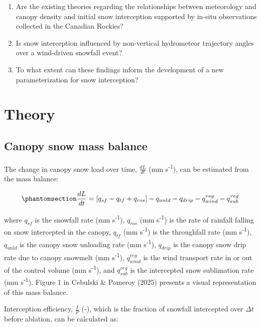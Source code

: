 \documentclass[
  letterpaper,
  DIV=11,
  numbers=noendperiod]{scrartcl}
\begin{document}
\begin{enumerate}
\def\labelenumi{\arabic{enumi}.}
\item
  Are the existing theories regarding the relationships between
  meteorology and canopy density and initial snow interception supported
  by in-situ observations collected in the Canadian Rockies?
\item
  Is snow interception influenced by non-vertical hydrometeor trajectory
  angles over a wind-driven snowfall event?
\item
  To what extent can these findings inform the development of a new
  parameterization for snow interception?
\end{enumerate}

\section{Theory}\label{theory}

\subsection{Canopy snow mass balance}\label{canopy-snow-mass-balance}

The change in canopy snow load over time, \(\frac{dL}{dt}\) (mm
s\textsuperscript{-1}), can be estimated from the mass balance:

\begin{equation}\phantomsection\label{eq-canopy-mass-bal}{
\frac{dL}{dt} = 
[q_{sf} - q_{tf} + q_{ros}] - q_{unld} - q_{drip} - q_{wind}^{veg} - q_{sub}^{veg}
}\end{equation}

where \(q_{sf}\) is the snowfall rate (mm s\textsuperscript{-1}),
\(q_{ros}\) (mm s\textsuperscript{-1}) is the rate of rainfall falling
on snow intercepted in the canopy, \(q_{tf}\) (mm s\textsuperscript{-1})
is the throughfall rate (mm s\textsuperscript{-1}), \(q_{unld}\) is the
canopy snow unloading rate (mm s\textsuperscript{-1}), \(q_{drip}\) is
the canopy snow drip rate due to canopy snowmelt (mm
s\textsuperscript{-1}), \(q_{wind}^{veg}\) is the wind transport rate in
or out of the control volume (mm s\textsuperscript{-1}), and
\(q_{sub}^{veg}\) is the intercepted snow sublimation rate (mm
s\textsuperscript{-1}). Figure 1 in Cebulski \& Pomeroy (2025) presents
a visual representation of this mass balance.

Interception efficiency, \(\frac{I}{P}\) (-), which is the fraction of
snowfall intercepted over \(\Delta t\) before ablation, can be
calculated as:
\end{document}
